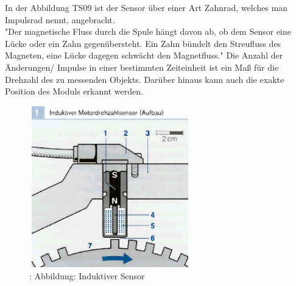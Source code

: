 			
				\begin{flushleft}
					In der Abbildung TS09 ist der Sensor über einer Art Zahnrad, welches man Impulsrad nennt, angebracht.\\
					"Der magnetische Fluss durch die Spule hängt davon ab, ob dem Sensor eine Lücke oder ein Zahn gegenübersteht. Ein Zahn bündelt den Streufluss des Magneten, eine Lücke dagegen schwächt den Magnetfluss." \cite{TS08}  
					Die Anzahl der Änderungen/ Impulse in einer bestimmten Zeiteinheit ist ein Maß für die Drehzahl des zu messenden Objekts. Darüber hinaus kann auch die exakte Position des Moduls erkannt werden.\\						
				\end{flushleft}
			
			
		
				\begin{figure}
					\centering
					\includegraphics[width=7cm, height=7cm] {aufbau_induktiv.png}
					\caption{\cite{TS09}: Abbildung: Induktiver Sensor}
				\end{figure}
				
